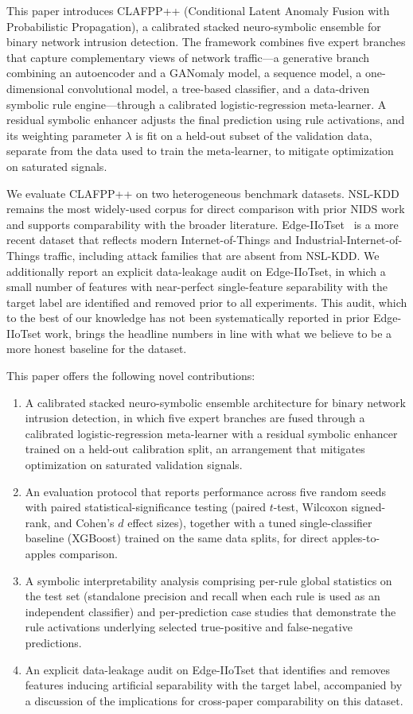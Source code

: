 \documentclass[pdflatex,sn-mathphys-num]{sn-jnl}
\theoremstyle{thmstyleone}
\theoremstyle{thmstyletwo}
\theoremstyle{thmstylethree}
\begin{document}
This paper introduces CLAFPP++ (Conditional Latent Anomaly Fusion with Probabilistic Propagation), a calibrated stacked neuro-symbolic ensemble for binary network intrusion detection. The framework combines five expert branches that capture complementary views of network traffic---a generative branch combining an autoencoder and a GANomaly model, a sequence model, a one-dimensional convolutional model, a tree-based classifier, and a data-driven symbolic rule engine---through a calibrated logistic-regression meta-learner. A residual symbolic enhancer adjusts the final prediction using rule activations, and its weighting parameter $\lambda$ is fit on a held-out subset of the validation data, separate from the data used to train the meta-learner, to mitigate optimization on saturated signals.

We evaluate CLAFPP++ on two heterogeneous benchmark datasets. NSL-KDD~\cite{tavallaee2009detailed} remains the most widely-used corpus for direct comparison with prior NIDS work and supports comparability with the broader literature. Edge-IIoTset~\cite{ferrag2022edge} is a more recent dataset that reflects modern Internet-of-Things and Industrial-Internet-of-Things traffic, including attack families that are absent from NSL-KDD. We additionally report an explicit data-leakage audit on Edge-IIoTset, in which a small number of features with near-perfect single-feature separability with the target label are identified and removed prior to all experiments. This audit, which to the best of our knowledge has not been systematically reported in prior Edge-IIoTset work, brings the headline numbers in line with what we believe to be a more honest baseline for the dataset.

This paper offers the following novel contributions:
\begin{enumerate}
    \item A calibrated stacked neuro-symbolic ensemble architecture for binary network intrusion detection, in which five expert branches are fused through a calibrated logistic-regression meta-learner with a residual symbolic enhancer trained on a held-out calibration split, an arrangement that mitigates optimization on saturated validation signals.
    \item An evaluation protocol that reports performance across five random seeds with paired statistical-significance testing (paired $t$-test, Wilcoxon signed-rank, and Cohen's $d$ effect sizes), together with a tuned single-classifier baseline (XGBoost) trained on the same data splits, for direct apples-to-apples comparison.
    \item A symbolic interpretability analysis comprising per-rule global statistics on the test set (standalone precision and recall when each rule is used as an independent classifier) and per-prediction case studies that demonstrate the rule activations underlying selected true-positive and false-negative predictions.
    \item An explicit data-leakage audit on Edge-IIoTset that identifies and removes features inducing artificial separability with the target label, accompanied by a discussion of the implications for cross-paper comparability on this dataset.
\end{enumerate}
\end{document}
